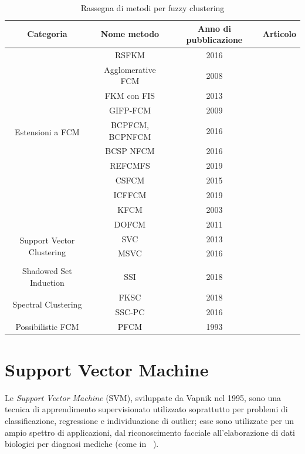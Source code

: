 \documentclass[oneside, openany]{book}
\begin{document}
		\begin{table}[h!]
			\caption{Rassegna di metodi per fuzzy clustering}
			\begin{center}\begin{tabular}{ |c|c|c|c| } 
					\hline
					Categoria & Nome metodo & Anno di pubblicazione & Articolo\\
					\hline
					\multirow{10}{4em}{Estensioni a FCM} 
					& RSFKM & 2016 & \cite{bib:rsfkm}\\ 
					& Agglomerative FCM & 2008 & \cite{bib:afkm}\\
					& FKM con FIS & 2013 & \cite{bib:fkmfis}\\ 
					& GIFP-FCM & 2009 & \cite{bib:gifpfcm}\\
					& BCPFCM, BCPNFCM & 2016 & \cite{bib:bcpfcm}\\
					& BCSP NFCM & 2016 & \cite{bib:bcpfcm}\\
					& REFCMFS & 2019 & \cite{bib:refcmfs}\\ 
					& CSFCM & 2015 & \cite{bib:csfcm}\\
					& ICFFCM & 2019 &\cite{bib:icffcm}\\
					& KFCM & 2003 &\cite{bib:kfcm}\\
					& DOFCM & 2011 & \cite{bib:dofcm}\\
					\hline													
					\multirow{2}{4em}{Support Vector Clustering}	& SVC & 2013 & \cite{bib:svc}\\ 
					& MSVC & 2016 & \cite{bib:msvc}\\ 
					&  &  & \\
					\hline
					\multirow{3}{4em}{Shadowed Set Induction} & & & \\
					& SSI & 2018 & \cite{bib:ssi}\\
					& & & \\	
					\hline
					\multirow{2}{4em}{Spectral Clustering}	& FKSC & 2018 & \cite{bib:fksc}\\ 
					& SSC-PC & 2016 & \cite{bib:sscpc}\\ 
					\hline
					Possibilistic FCM & PFCM & 1993 & \cite{bib:pfcm}\\
					\hline
				\end{tabular}
			\end{center}
			\label{tab:clustering}	
		\end{table}
	
	\section{Support Vector Machine}
	Le \textit{Support Vector Machine} (SVM), sviluppate da Vapnik nel 1995, sono una tecnica di apprendimento supervisionato utilizzato soprattutto per problemi di classificazione, regressione e individuazione di outlier; esse sono utilizzate per un ampio spettro di applicazioni, dal riconoscimento facciale \cite{bib:svmfr, bib:svmfr2} all'elaborazione di dati biologici per diagnosi mediche (come in ~\cite{bib:svmmed,bib:svmmed2}).
	
\end{document}
